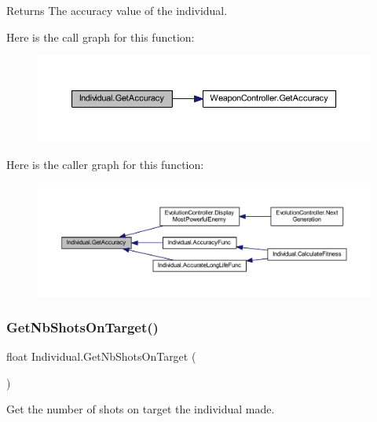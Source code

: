 \begin{DoxyReturn}{Returns}
The accuracy value of the individual.
\end{DoxyReturn}
Here is the call graph for this function\+:\nopagebreak
\begin{figure}[H]
\begin{center}
\leavevmode
\includegraphics[width=350pt]{class_individual_a5d4fb02c8072b931ffde1a03afb26271_cgraph}
\end{center}
\end{figure}
Here is the caller graph for this function\+:\nopagebreak
\begin{figure}[H]
\begin{center}
\leavevmode
\includegraphics[width=350pt]{class_individual_a5d4fb02c8072b931ffde1a03afb26271_icgraph}
\end{center}
\end{figure}
\mbox{\label{class_individual_a100f431028b5b9d385348fdb000e3b32}} 
\subsubsection{\texorpdfstring{Get\+Nb\+Shots\+On\+Target()}{GetNbShotsOnTarget()}}
{\footnotesize\ttfamily float Individual.\+Get\+Nb\+Shots\+On\+Target (\begin{DoxyParamCaption}{ }\end{DoxyParamCaption})}



Get the number of shots on target the individual made. 

